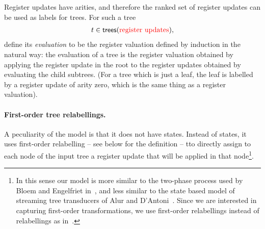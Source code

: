 Register updates have arities, and therefore the ranked set of register updates can be used as labels for trees. For such a  tree 
\begin{align*}
    t \in  \mathsf {trees}({\color{red}{\text{register updates}}}),
\end{align*}
define its \emph{evaluation} to be the register valuation defined by induction in the natural way: the evaluation of a tree is the register valuation obtained by applying the register update in the root to the register updates obtained by evaluating the child subtrees. (For a tree which is just a leaf, the leaf is labelled by a register update of arity zero, which is the same thing as a register valuation). 


\paragraph*{First-order tree relabellings.} A peculiarity of the model is that it does not have states. Instead of states, it uses first-order relabelling -- see below for the definition -- tto  directly assign to each node of the input tree a register update that will be applied in that node\footnote{In this sense our model is more similar to the two-phase process used by Bloem and Engelfriet in~\cite[Theorem 17]{bloem_comparison_2000}, and less similar to the state based model of streaming tree transducers of Alur and D'Antoni~\cite{alur2017streaming}. Since we are interested in capturing first-order transformations, we use first-order relabellings instead of \mso relabellings as in~\cite[p.11]{bloem_comparison_2000}.}.




